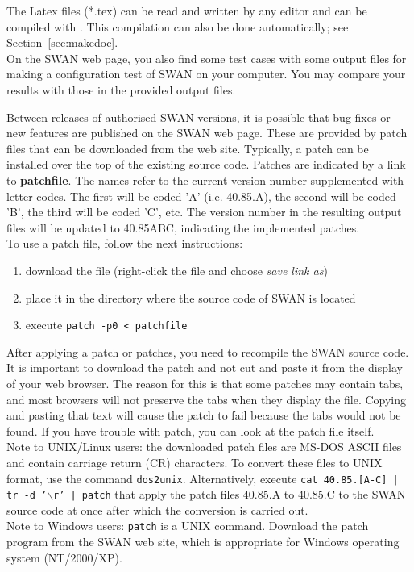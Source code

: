 \documentclass[12pt]{book}
\begin{document}
\noindent
The Latex files (*.tex) can be read and written by any editor and can be compiled with \LaTeXe.
This compilation can also be done automatically; see Section~\ref{sec:makedoc}.
\\[2ex]
\noindent
On the SWAN web page, you also find some test cases with some output files for making a
configuration test of SWAN on your computer. You may compare your results with those in
the provided output files.

 \label{ch:patch}

Between releases of authorised SWAN versions, it is possible that bug fixes or new
features are published on the SWAN web page. These are provided by patch files that can
be downloaded from the web site. Typically, a patch can be installed over the top of the
existing source code. Patches are indicated by a link to {\bf patchfile}. The names
refer to the current version number supplemented with letter codes. The first will be
coded 'A' (i.e. 40.85.A), the second will be coded 'B', the third will be coded 'C', etc.
The version number in the resulting output files will be updated to 40.85ABC, indicating
the implemented patches.
\\[2ex]
\noindent
To use a patch file, follow the next instructions:
\begin{enumerate}
  \item download the file (right-click the file and choose {\it save link as})
  \item place it in the directory where the source code of SWAN is located
  \item execute {\tt patch -p0 < patchfile}
\end{enumerate}
After applying a patch or patches, you need to recompile the SWAN source code.
\\[2ex]
\noindent
It is important to download the patch and not cut and paste it from the display
of your web browser. The reason for this is that some patches may contain tabs,
and most browsers will not preserve the tabs when they display the file. Copying
and pasting that text will cause the patch to fail because the tabs would not be
found. If you have trouble with patch, you can look at the patch file itself.
\\[2ex]
\noindent
Note to UNIX/Linux users:
the downloaded patch files are MS-DOS ASCII files and contain carriage return (CR) characters.
To convert these files to  UNIX format, use the command {\tt dos2unix}. Alternatively,
execute {\tt cat 40.85.[A-C] | tr -d '$\backslash$r' | patch} that apply the patch files
40.85.A to 40.85.C to the SWAN source code at once after which the conversion is
carried out.
\\[2ex]
\noindent
Note to Windows users: {\tt patch} is a UNIX command. Download the patch program
from the SWAN web site, which is appropriate for Windows operating system (NT/2000/XP).
\end{document}
